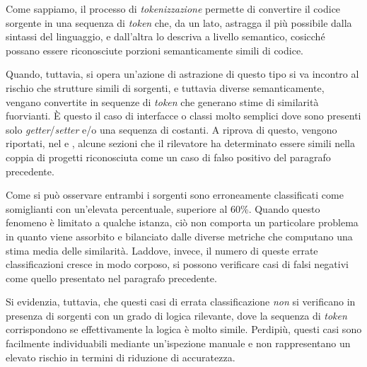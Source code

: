 Come sappiamo, il processo di \textit{tokenizzazione} permette di convertire il codice sorgente in una sequenza di \textit{token} che, da un lato, astragga il più possibile dalla sintassi del linguaggio, e dall'altra lo descriva a livello semantico, cosicché possano essere riconosciute porzioni semanticamente simili di codice.

Quando, tuttavia, si opera un'azione di astrazione di questo tipo si va incontro al rischio che strutture simili di sorgenti, e tuttavia diverse semanticamente, vengano convertite in sequenze di \textit{token} che generano stime di similarità fuorvianti.
%
\`E questo il caso di interfacce o classi molto semplici dove sono presenti solo \textit{getter}/\textit{setter} e/o una sequenza di costanti.
%
A riprova di questo, vengono riportati, nel  e , alcune sezioni che il rilevatore ha determinato essere simili nella coppia di progetti riconosciuta come un caso di falso positivo del paragrafo precedente. 

\newpage



\newpage



Come si può osservare entrambi i sorgenti sono erroneamente classificati come somiglianti con un'elevata percentuale, superiore al 60\%.
%
Quando questo fenomeno è limitato a qualche istanza, ciò non comporta un particolare problema in quanto viene assorbito e bilanciato dalle diverse metriche che computano una stima media delle similarità.
%
Laddove, invece, il numero di queste errate classificazioni cresce in modo corposo,  si possono verificare casi di falsi negativi come quello presentato nel paragrafo precedente.

Si evidenzia, tuttavia, che questi casi di errata classificazione \textit{non} si verificano in presenza di sorgenti con un grado di logica rilevante, dove la sequenza di \textit{token} corrispondono se effettivamente la logica è molto simile.
%
Perdipiù, questi casi sono facilmente individuabili mediante un'ispezione manuale e non rappresentano un elevato rischio in termini di riduzione di accuratezza.

